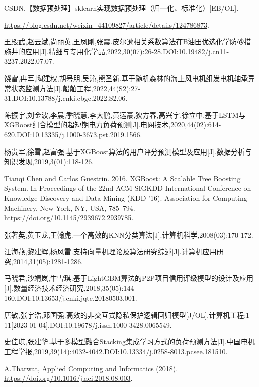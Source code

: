\documentclass{MathorCupmodeling}
\begin{document}
	\newpage
	\begin{spacing}{1.08}
	\begin{thebibliography}{99}
	CSDN.【数据预处理】sklearn实现数据预处理（归一化、标准化）[EB/OL].
	
	\url{https://blog.csdn.net/weixin_44109827/article/details/124786873}.


	王殿武,赵云斌,尚丽英,王凤刚,张震.皮尔逊相关系数算法在B油田优选化学防砂措施井的应用[J].精细与专用化学品,2022,30(07):26-28.DOI:10.19482/j.cn11-3237.2022.07.07.

	饶雷,冉军,陶建权,胡号朋,吴沁,熊圣新.基于随机森林的海上风电机组发电机轴承异常状态监测方法[J].船舶工程,2022,44(S2):27-31.DOI:10.13788/j.cnki.cbgc.2022.S2.06.

	陈振宇,刘金波,李晨,季晓慧,李大鹏,黄运豪,狄方春,高兴宇,徐立中.基于LSTM与XGBoost组合模型的超短期电力负荷预测[J].电网技术,2020,44(02):614-620.DOI:10.13335/j.1000-3673.pst.2019.1566.

	杨贵军,徐雪,赵富强.基于XGBoost算法的用户评分预测模型及应用[J].数据分析与知识发现,2019,3(01):118-126.

	Tianqi Chen and Carlos Guestrin. 2016. XGBoost: A Scalable Tree Boosting System. In Proceedings of the 22nd ACM SIGKDD International Conference on Knowledge Discovery and Data Mining (KDD '16). Association for Computing Machinery, New York, NY, USA, 785–794. \url{https://doi.org/10.1145/2939672.2939785}.

	张著英,黄玉龙,王翰虎.一个高效的KNN分类算法[J].计算机科学,2008(03):170-172.

	汪海燕,黎建辉,杨风雷.支持向量机理论及算法研究综述[J].计算机应用研究,2014,31(05):1281-1286.

	马晓君,沙靖岚,牛雪琪.基于LightGBM算法的P2P项目信用评级模型的设计及应用[J].数量经济技术经济研究,2018,35(05):144-160.DOI:10.13653/j.cnki.jqte.20180503.001.

	唐敏,张宇浩,邓国强.高效的非交互式隐私保护逻辑回归模型[J/OL].计算机工程:1-11[2023-01-04].DOI:10.19678/j.issn.1000-3428.0065549.

	史佳琪,张建华.基于多模型融合Stacking集成学习方式的负荷预测方法[J].中国电机工程学报,2019,39(14):4032-4042.DOI:10.13334/j.0258-8013.pcsee.181510.

	A.Tharwat, Applied Computing and Informatics (2018). \url{https://doi.org/10.1016/j.aci.2018.08.003}.
	\end{thebibliography}
	\end{spacing}
	\newpage
\end{document}
